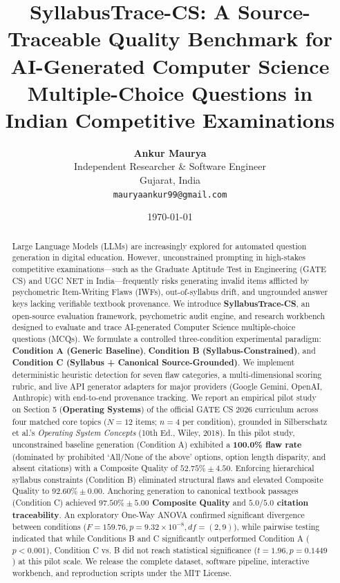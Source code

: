 \documentclass[10pt,twocolumn,letterpaper]{article}
\title{\textbf{SyllabusTrace-CS: A Source-Traceable Quality Benchmark for AI-Generated Computer Science Multiple-Choice Questions in Indian Competitive Examinations}}
\author{
  \textbf{Ankur Maurya}\\
  Independent Researcher \& Software Engineer\\
  Gujarat, India\\
  \texttt{mauryaankur99@gmail.com}
}
\date{\today}
\begin{document}
\maketitle

\begin{abstract}
Large Language Models (LLMs) are increasingly explored for automated question generation in digital education. However, unconstrained prompting in high-stakes competitive examinations---such as the Graduate Aptitude Test in Engineering (GATE CS) and UGC NET in India---frequently risks generating invalid items afflicted by psychometric Item-Writing Flaws (IWFs), out-of-syllabus drift, and ungrounded answer keys lacking verifiable textbook provenance. We introduce \textbf{SyllabusTrace-CS}, an open-source evaluation framework, psychometric audit engine, and research workbench designed to evaluate and trace AI-generated Computer Science multiple-choice questions (MCQs). We formulate a controlled three-condition experimental paradigm: \textbf{Condition A (Generic Baseline)}, \textbf{Condition B (Syllabus-Constrained)}, and \textbf{Condition C (Syllabus + Canonical Source-Grounded)}. We implement deterministic heuristic detection for seven flaw categories, a multi-dimensional scoring rubric, and live API generator adapters for major providers (Google Gemini, OpenAI, Anthropic) with end-to-end provenance tracking. We report an empirical pilot study on Section 5 (\textbf{Operating Systems}) of the official GATE CS 2026 curriculum across four matched core topics ($N=12$ items; $n=4$ per condition), grounded in Silberschatz et al.'s \textit{Operating System Concepts} (10th Ed., Wiley, 2018). In this pilot study, unconstrained baseline generation (Condition A) exhibited a \textbf{100.0\% flaw rate} (dominated by prohibited `All/None of the above' options, option length disparity, and absent citations) with a Composite Quality of $52.75\% \pm 4.50$. Enforcing hierarchical syllabus constraints (Condition B) eliminated structural flaws and elevated Composite Quality to $92.60\% \pm 0.00$. Anchoring generation to canonical textbook passages (Condition C) achieved \textbf{$97.50\% \pm 5.00$ Composite Quality} and \textbf{$5.0 / 5.0$ citation traceability}. An exploratory One-Way ANOVA confirmed significant divergence between conditions ($F = 159.76, p = 9.32 \times 10^{-8}, df=(2, 9)$), while pairwise testing indicated that while Conditions B and C significantly outperformed Condition A ($p < 0.001$), Condition C vs. B did not reach statistical significance ($t = 1.96, p = 0.1449$) at this pilot scale. We release the complete dataset, software pipeline, interactive workbench, and reproduction scripts under the MIT License.
\end{abstract}
\end{document}

